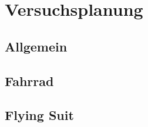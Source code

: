\chapter{Versuchsplanung}
\label{cha:versuchsplanung}

\section{Allgemein}

\section{Fahrrad}

\section{Flying Suit}

